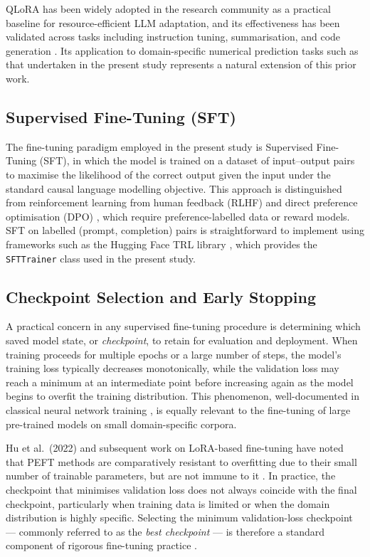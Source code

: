 QLoRA has been widely adopted in the research community as a practical baseline for resource-efficient LLM adaptation, and its effectiveness has been validated across tasks including instruction tuning, summarisation, and code generation \cite{dettmers2023qlora}. Its application to domain-specific numerical prediction tasks such as that undertaken in the present study represents a natural extension of this prior work.

\subsection{Supervised Fine-Tuning (SFT)}

The fine-tuning paradigm employed in the present study is Supervised Fine-Tuning (SFT), in which the model is trained on a dataset of input--output pairs to maximise the likelihood of the correct output given the input under the standard causal language modelling objective. This approach is distinguished from reinforcement learning from human feedback (RLHF) \cite{ouyang2022training} and direct preference optimisation (DPO) \cite{rafailov2023direct}, which require preference-labelled data or reward models. SFT on labelled (prompt, completion) pairs is straightforward to implement using frameworks such as the Hugging Face TRL library \cite{vonwerra2022trl}, which provides the \texttt{SFTTrainer} class used in the present study.

\subsection{Checkpoint Selection and Early Stopping}

A practical concern in any supervised fine-tuning procedure is determining which saved model state, or \textit{checkpoint}, to retain for evaluation and deployment. When training proceeds for multiple epochs or a large number of steps, the model's training loss typically decreases monotonically, while the validation loss may reach a minimum at an intermediate point before increasing again as the model begins to overfit the training distribution. This phenomenon, well-documented in classical neural network training \cite{prechelt1998early}, is equally relevant to the fine-tuning of large pre-trained models on small domain-specific corpora.

Hu et al.\ (2022) and subsequent work on LoRA-based fine-tuning have noted that PEFT methods are comparatively resistant to overfitting due to their small number of trainable parameters, but are not immune to it \cite{hu2022lora}. In practice, the checkpoint that minimises validation loss does not always coincide with the final checkpoint, particularly when training data is limited or when the domain distribution is highly specific. Selecting the minimum validation-loss checkpoint --- commonly referred to as the \textit{best checkpoint} --- is therefore a standard component of rigorous fine-tuning practice \cite{loshchilov2019decoupled}.

